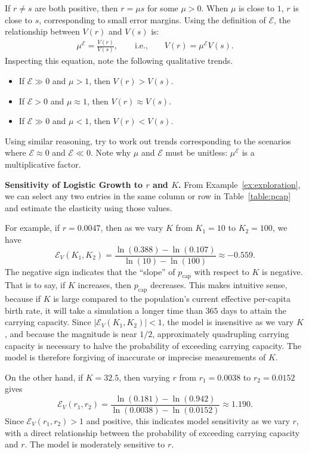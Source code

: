 If $r \neq s$ are both positive, then $r = \mu s$ for some $\mu > 0$. When $\mu$ is close to $1$, $r$ is close to $s$, corresponding to small error margins. Using the definition of $\mathcal{E}$, the relationship between $V(r)$ and $V(s)$ is:
\begin{align*}
\mu^{\mathcal{E}} = \frac{V(r)}{V(s)}, \qquad \text{i.e.,} \qquad V(r) = \mu^{\mathcal{E}} V(s).
\end{align*}
Inspecting this equation, note the following qualitative trends.
\begin{itemize}
\item If $\mathcal{E} \gg 0$ and $\mu > 1$, then $V(r) > V(s)$.
\item If $\mathcal{E} > 0$ and $\mu \approx 1$, then $V(r) \approx V(s)$.
\item If $\mathcal{E} \gg 0$ and $\mu < 1$, then $V(r) < V(s)$.
\end{itemize}
Using similar reasoning, try to work out trends corresponding to the scenarios where $\mathcal{E} \approx 0$ and $\mathcal{E} \ll 0$. Note why $\mu$ and $\mathcal{E}$ must be unitless: $\mu^{\mathcal{E}}$ is a multiplicative factor.

\begin{example}\label{ex:basic_sensitivity_analysis}
\textbf{Sensitivity of Logistic Growth to $r$ and $K$.}
From Example~\ref{ex:exploration}, we can select any two entries in the same column or row in Table~\ref{table:pcap} and estimate the elasticity using those values.

For example, if $r = 0.0047$, then as we vary $K$ from $K_1 = 10$ to $K_2 = 100$, we have \[\mathcal{E}_{V}(K_1,K_2) = \frac{\ln(0.388) - \ln(0.107)}{\ln(10) - \ln(100)} \approx -0.559.\]
The negative sign indicates that the ``slope'' of $p_{\text{cap}}$ with respect to $K$ is negative.
That is to say, if $K$ increases, then $p_{\text{cap}}$ decreases. This makes intuitive sense, because if $K$ is large compared to the population's current effective per-capita birth rate, it will take a simulation a longer time than $365$ days to attain the carrying capacity.
Since $\left|\mathcal{E}_{V}(K_1,K_2)\right| < 1$, the model is insensitive as we vary $K$, and because the magnitude is near $1/2$, approximately quadrupling carrying capacity is necessary to halve the probability of exceeding carrying capacity. The model is therefore forgiving of inaccurate or imprecise measurements of $K$.

On the other hand, if $K = 32.5$, then varying $r$ from $r_1 = 0.0038$ to $r_2 = 0.0152$ gives
\[\mathcal{E}_{V}(r_1,r_2) = \frac{\ln(0.181) - \ln(0.942)}{\ln(0.0038) - \ln(0.0152)} \approx 1.190.\]
Since $\mathcal{E}_{V}(r_1,r_2) > 1$ and positive, this indicates model sensitivity as we vary $r$, with a direct relationship between the probability of exceeding carrying capacity and $r$. The model is moderately sensitive to $r$.
\end{example}


